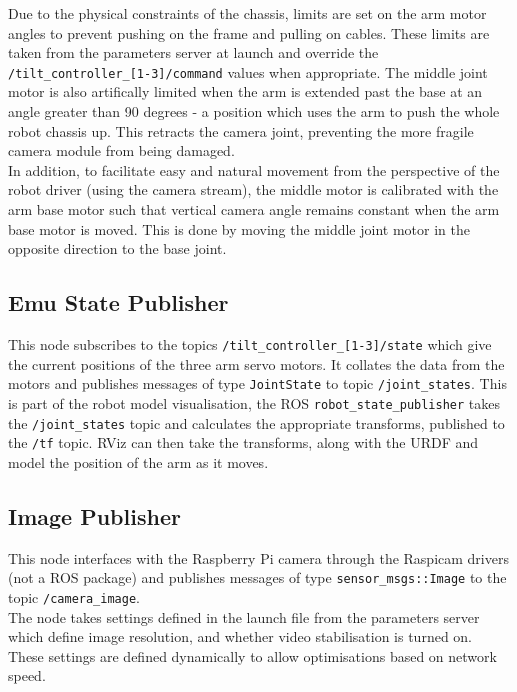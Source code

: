 \documentclass[titlepage,12pt,a4paper]{article}
\begin{document}
\noindent Due to the physical constraints of the chassis, limits are set on the arm motor angles to prevent pushing on the frame and pulling on cables. These limits are taken from the parameters server at launch and override the \texttt{/tilt\_controller\_[1-3]/command} values when appropriate. The middle joint motor is also artifically limited when the arm is extended past the base at an angle greater than 90 degrees - a position which uses the arm to push the whole robot chassis up. This retracts the camera joint, preventing the more fragile camera module from being damaged.\\

\noindent In addition, to facilitate easy and natural movement from the perspective of the robot driver (using the camera stream), the middle motor is calibrated with the arm base motor such that vertical camera angle remains constant when the arm base motor is moved. This is done by moving the middle joint motor in the opposite direction to the base joint.\\

\subsection*{Emu State Publisher}
This node subscribes to the topics \texttt{/tilt\_controller\_[1-3]/state} which give the current positions of the three arm servo motors. It collates the data from the motors and publishes messages of type \texttt{JointState} to topic \texttt{/joint\_states}. This is part of the robot model visualisation, the ROS \texttt{robot\_state\_publisher} takes the \texttt{/joint\_states} topic and calculates the appropriate transforms, published to the \texttt{/tf} topic. RViz can then take the transforms, along with the URDF and model the position of the arm as it moves. \\

\subsection*{Image Publisher}
This node interfaces with the Raspberry Pi camera through the Raspicam drivers (not a ROS package) and publishes messages of type \texttt{sensor\_msgs::Image} to the topic \texttt{/camera\_image}.\\

\noindent The node takes settings defined in the launch file from the parameters server which define image resolution, and whether video stabilisation is turned on. These settings are defined dynamically to allow optimisations based on network speed.\\
\end{document}
